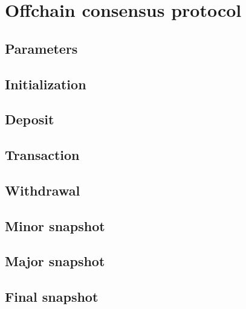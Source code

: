 \documentclass[../hydrozoa.tex]{subfiles}
\begin{document}
\chapter{Offchain consensus protocol}%
\label{h:offchain-consensus-protocol}

\section{Parameters}%
\label{h:consensus-parameters}




\section{Initialization}%
\label{h:consensus-intitialization}



\section{Deposit}%
\label{h:consensus-deposit}



\section{Transaction}%
\label{h:consensus-transaction}


\section{Withdrawal}%
\label{h:consensus-withdrawal}


\section{Minor snapshot}%
\label{h:consensus-minor-snapshot}



\section{Major snapshot}%
\label{h:consensus-major-snapshot}



\section{Final snapshot}%
\label{h:consensus-final-snapshot}


\end{document}
